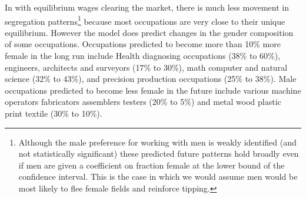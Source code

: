 \documentclass[11pt]{article}
\begin{document}


In with equilibrium wages clearing the market, there is much less movement in segregation patterns\footnote{Although the male preference for working with men is weakly identified (and not statistically significant) these predicted future patterns hold broadly even if men are given a coefficient on fraction female at the lower bound of the confidence interval. This is the case in which we would assume men would be most likely to flee female fields and reinforce tipping.} because most occupations are very close to their unique equilibrium. However the model does predict changes in the gender composition of some occupations. Occupations predicted to become more than 10\% more female in the long run include Health diagnosing occupations (38\% to 60\%), engineers, architects and surveyors (17\% to 30\%), math computer and natural science (32\% to 43\%), and precision production occupations (25\% to 38\%). Male occupations predicted to become less female in the future include various machine operators fabricators assemblers testers (20\% to 5\%) and metal wood plastic print textile (30\% to 10\%).
















\end{document}
